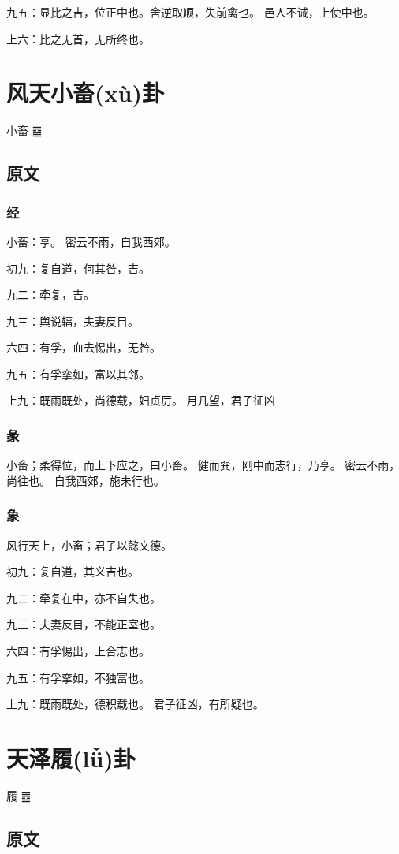 \documentclass[12pt,oneside]{book}
\begin{document}
九五：显比之吉，位正中也。舍逆取顺，失前禽也。 邑人不诫，上使中也。

上六：比之无首，无所终也。



\chapter{风天小畜(xù)卦}
小畜 {\Large ䷈}

\section{原文}

\subsection{经}
小畜：亨。 密云不雨，自我西郊。

初九：复自道，何其咎，吉。

九二：牵复，吉。

九三：舆说辐，夫妻反目。

六四：有孚，血去惕出，无咎。

九五：有孚挛如，富以其邻。

上九：既雨既处，尚德载，妇贞厉。 月几望，君子征凶

\subsection{彖}
小畜；柔得位，而上下应之，曰小畜。 健而巽，刚中而志行，乃亨。 密云不雨，尚往也。 自我西郊，施未行也。

\subsection{象}
风行天上，小畜；君子以懿文德。

初九：复自道，其义吉也。

九二：牵复在中，亦不自失也。

九三：夫妻反目，不能正室也。

六四：有孚惕出，上合志也。

九五：有孚挛如，不独富也。

上九：既雨既处，德积载也。 君子征凶，有所疑也。


\chapter{天泽履(lǚ)卦}
履 {\Large ䷉}

\section{原文}
\end{document}
